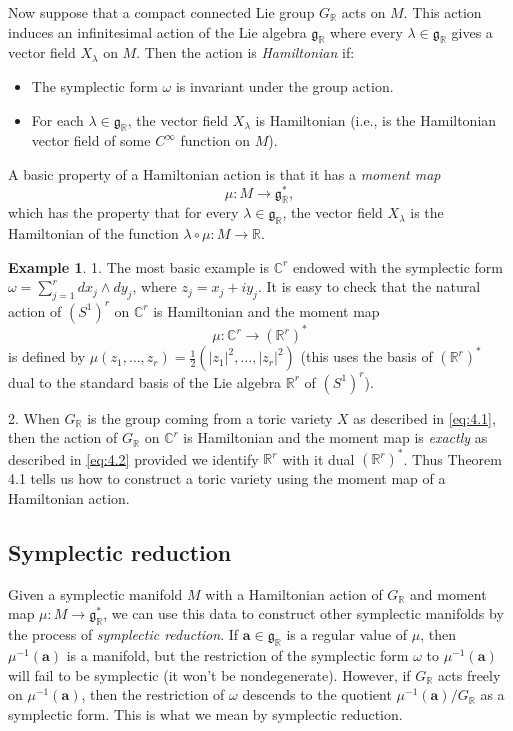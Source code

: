 \documentclass{amsart}
\theoremstyle{plain}
\theoremstyle{definition}
\newtheorem*{example}{Example}
\begin{document}
	Now suppose that a compact connected Lie group $G_{\mathbb{R}}$
acts on $M$.  This action induces an infinitesimal action of the Lie
algebra $\mathfrak{g}_{\mathbb{R}}$ where every $\lambda \in \mathfrak{g}_{\mathbb{R}}$ gives a vector field $X_\lambda$ on $M$.  Then the
action is {\it Hamiltonian\/} if:
\begin{itemize}
\item The symplectic form $\omega$ is invariant under the group
action.
\item For each $\lambda \in \mathfrak{g}_{\mathbb{R}}$, the vector field
$X_\lambda$ is Hamiltonian (i.e., is the Hamiltonian vector field of
some $C^\infty$ function on $M$).
\end{itemize}
A basic property of a Hamiltonian action is that it has a {\it
moment map\/}
\[
\mu : M \longrightarrow \mathfrak{g}_{\mathbb{R}}^*,
\]
which has the property that for every $\lambda \in \mathfrak{g}_{\mathbb{R}}$, the vector field $X_\lambda$ is the Hamiltonian of the
function $\lambda\circ\mu : M \to \mathbb{R}$.

\begin{example} 1. The most basic example is $\mathbb{C}^r$ endowed with
the symplectic form $\omega = \sum_{j=1}^r dx_j\wedge dy_j$, where
$z_j = x_j + iy_j$.  It is easy to check that the natural action of
$(S^1)^r$ on $\mathbb{C}^r$ is Hamiltonian and the moment map
\[
\mu : \mathbb{C}^r \longrightarrow (\mathbb{R}^r)^*
\]
is defined by $\mu(z_1,\dots,z_r) = \frac{1}{2}(|z_1|^2,\dots,|z_r|^2)$
(this uses the basis of $(\mathbb{R}^r)^*$ dual to the standard basis of
the Lie algebra $\mathbb{R}^r$ of $(S^1)^r$).

	2. When $G_{\mathbb{R}}$ is the group coming from a toric
variety $X$ as described in \eqref{eq:4.1}, then the action of $G_{\mathbb{R}}$ on $\mathbb{C}^r$ is Hamiltonian and the moment map is {\it
exactly\/} as described in \eqref{eq:4.2} provided we identify $\mathbb{R}^r$ with it dual $(\mathbb{R}^r)^*$.  Thus Theorem 4.1 tells us how
to construct a toric variety using the moment map of a Hamiltonian
action.
\end{example}

	\subsection{Symplectic reduction} Given a symplectic
manifold $M$ with a Hamiltonian action of $G_{\mathbb{R}}$ and moment
map $\mu : M \to \mathfrak{g}_{\mathbb{R}}^*$, we can use this data to
construct other symplectic manifolds by the process of {\it symplectic
reduction\/}.  If $\mathbf{a} \in \mathfrak{g}_{\mathbb{R}}$ is a regular
value of $\mu$, then $\mu^{-1}(\mathbf{a})$ is a manifold, but the
restriction of the symplectic form $\omega$ to $\mu^{-1}(\mathbf{a})$
will fail to be symplectic (it won't be nondegenerate).  However, if
$G_{\mathbb{R}}$ acts freely on $\mu^{-1}(\mathbf{a})$, then the
restriction of $\omega$ descends to the quotient
$\mu^{-1}(\mathbf{a})/G_{\mathbb{R}}$ as a symplectic form.  This is what
we mean by symplectic reduction.
\end{document}
